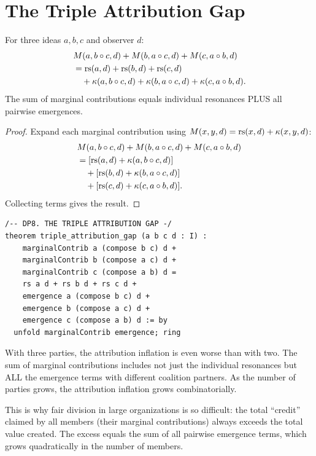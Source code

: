 \section{The Triple Attribution Gap}

\begin{theorem}
\label{thm:triple-attribution}
For three ideas $a, b, c$ and observer $d$:
\begin{align*}
&M(a, b \circ c, d) + M(b, a \circ c, d) + M(c, a \circ b, d) \\
&= \operatorname{rs}(a,d) + \operatorname{rs}(b,d) + \operatorname{rs}(c,d) \\
&\quad + \kappa(a, b \circ c, d) + \kappa(b, a \circ c, d) + \kappa(c, a \circ b, d).
\end{align*}
The sum of marginal contributions equals individual resonances PLUS all pairwise emergences.
\end{theorem}

\begin{proof}
Expand each marginal contribution using $M(x, y, d) = \operatorname{rs}(x,d) + \kappa(x,y,d)$:
\begin{align*}
&M(a, b \circ c, d) + M(b, a \circ c, d) + M(c, a \circ b, d) \\
&= [\operatorname{rs}(a,d) + \kappa(a, b \circ c, d)] \\
&\quad + [\operatorname{rs}(b,d) + \kappa(b, a \circ c, d)] \\
&\quad + [\operatorname{rs}(c,d) + \kappa(c, a \circ b, d)].
\end{align*}
Collecting terms gives the result.
\end{proof}

\begin{lstlisting}
/-- DP8. THE TRIPLE ATTRIBUTION GAP -/
theorem triple_attribution_gap (a b c d : I) :
    marginalContrib a (compose b c) d +
    marginalContrib b (compose a c) d +
    marginalContrib c (compose a b) d =
    rs a d + rs b d + rs c d +
    emergence a (compose b c) d +
    emergence b (compose a c) d +
    emergence c (compose a b) d := by
  unfold marginalContrib emergence; ring
\end{lstlisting}

\begin{interpretation}
With three parties, the attribution inflation is even worse than with two. The sum of marginal contributions includes not just the individual resonances but ALL the emergence terms with different coalition partners. As the number of parties grows, the attribution inflation grows combinatorially.

This is why fair division in large organizations is so difficult: the total ``credit'' claimed by all members (their marginal contributions) always exceeds the total value created. The excess equals the sum of all pairwise emergence terms, which grows quadratically in the number of members.
\end{interpretation}


